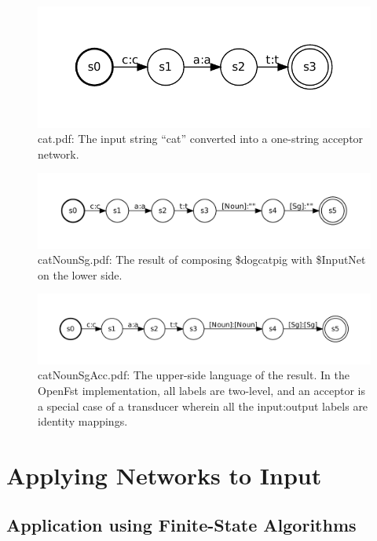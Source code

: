 \documentclass[letterpaper,12pt]{article}
\begin{document}
\begin{figure}
\includegraphics[width=15cm]{images/cat}
\caption{cat.pdf:  The input string ``cat'' converted into a one-string acceptor network.}
\label{fig:cat}
\end{figure}

\begin{figure}
\includegraphics[width=15cm]{images/catNounSg}
\caption{catNounSg.pdf: The result of composing \$dogcatpig with
\$InputNet on the lower side.}
\label{fig:catNounSg}
\end{figure}

\begin{figure}
\includegraphics[width=15cm]{images/catNounSgAcc}
\caption{catNounSgAcc.pdf:  The upper-side language of the result.  In the OpenFst implementation,
all labels are two-level, and an acceptor is a special case of a transducer wherein all the
input:output labels are identity mappings.}
\label{fig:catNounSgAcc}
\end{figure}



\section{Applying Networks to Input}

\subsection{Application using Finite-State Algorithms}
\end{document}
